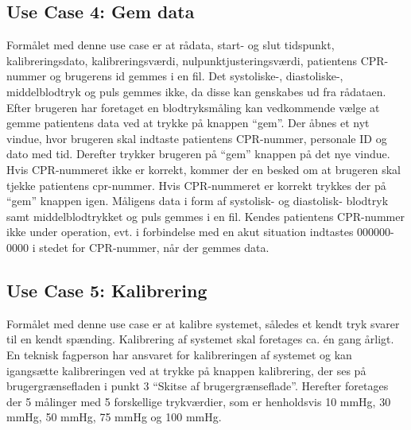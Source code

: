 \subsection{Use Case 4: Gem data}
Formålet med denne use case er at rådata, start- og slut tidspunkt, kalibreringsdato, kalibreringsværdi, nulpunktjusteringsværdi, patientens CPR-nummer og brugerens id gemmes i en fil. Det systoliske-, diastoliske-, middelblodtryk og puls gemmes ikke, da disse kan genskabes ud fra rådataen. Efter brugeren har foretaget en blodtryksmåling kan vedkommende vælge at gemme patientens data ved at trykke på knappen “gem”. Der åbnes et nyt vindue, hvor brugeren skal indtaste patientens CPR-nummer, personale ID og dato med tid. Derefter trykker brugeren på “gem” knappen på det nye vindue. Hvis CPR-nummeret ikke er korrekt, kommer der en besked om at brugeren skal tjekke patientens cpr-nummer. Hvis CPR-nummeret er korrekt trykkes der på “gem” knappen igen. Måligens data i form af systolisk- og diastolisk- blodtryk samt middelblodtrykket og puls gemmes i en fil. Kendes patientens CPR-nummer ikke under operation, evt. i forbindelse med en akut situation indtastes 000000-0000 i stedet for CPR-nummer, når der gemmes data.


\subsection{Use Case 5: Kalibrering}
Formålet med denne use case er at kalibre systemet, således et kendt tryk svarer til en kendt spænding. Kalibrering af systemet skal foretages ca. én gang årligt. En teknisk fagperson har ansvaret for kalibreringen af systemet og kan igangsætte kalibreringen ved at trykke på knappen kalibrering, der ses på brugergrænsefladen i punkt 3 “Skitse af brugergrænseflade”. Herefter foretages der 5 målinger med 5 forskellige trykværdier, som er henholdsvis 10 mmHg, 30 mmHg, 50 mmHg, 75 mmHg og 100 mmHg.
